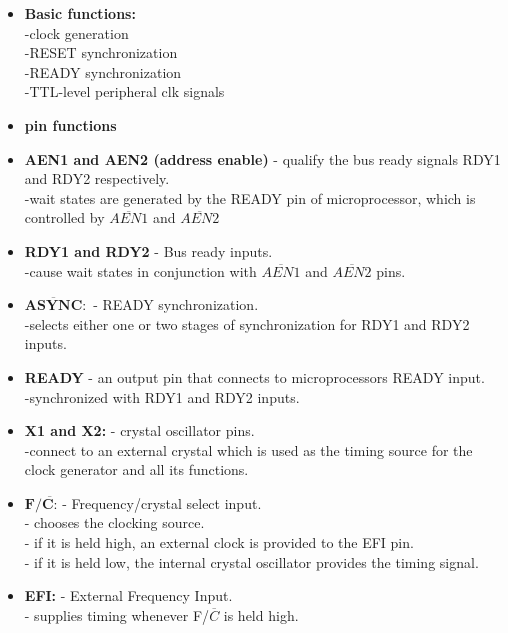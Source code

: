 \documentclass[12pt]{article}
\begin{document}
\begin{itemize}
	\item \textbf{Basic functions:}\\
	-clock generation\\
	-RESET synchronization\\
	-READY synchronization\\
	-TTL-level peripheral clk signals
	
	\item\textbf{pin functions}
	
	\item\textbf{AEN1 and AEN2 (address enable)} - qualify the bus ready signals RDY1 and RDY2 respectively.\\
	-wait states are generated by the READY pin of microprocessor, which is controlled by $\overline{AEN1}$ and $\overline{AEN2}$
	
	\item\textbf{RDY1 and RDY2} - Bus ready inputs.\\
	-cause wait states in conjunction with $\overline{AEN1}$ and $\overline{AEN2}$ pins.
	
	\item$\overline{\textbf{ASYNC}}:$ - READY synchronization.\\
	-selects either one or two stages of synchronization for RDY1 and RDY2 inputs.
	
	\item\textbf{READY} - an output pin that connects to microprocessors READY input.\\
	-synchronized with RDY1 and RDY2 inputs.
	
	\item \textbf{X1 and X2:} - crystal oscillator pins.\\
	-connect to an external crystal which is used as the timing source for the clock generator and all its functions.
	
	\item $\textbf{F/}\overline{\textbf{C:}}$ - Frequency/crystal select input.\\
	- chooses the clocking source.\\
	- if it is held high, an external clock is provided to the EFI pin.\\
	- if it is held low, the internal crystal oscillator provides the timing signal.
	
	\item \textbf{EFI:} - External Frequency Input.\\
	- supplies timing whenever F/$\overline{C}$ is held high.
	

\end{itemize}
\end{document}
